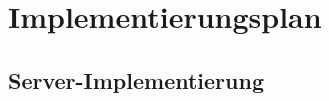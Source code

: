 \def\pgfcalendarweekdayletter#1{%
	\ifcase#1M\or D\or M\or D\or F\or S\or S\fi%
} 
\def\pgfcalendarmonthname#1{%
	\ifcase#1 Dezember \or Januar\or Februar\or März\or April\or Mai\or Juni\or Juli \or August \or S. \or Oktober \or November \or Dezember\fi%
}  


\section{Implementierungsplan}

\subsection{Server-Implementierung}





	